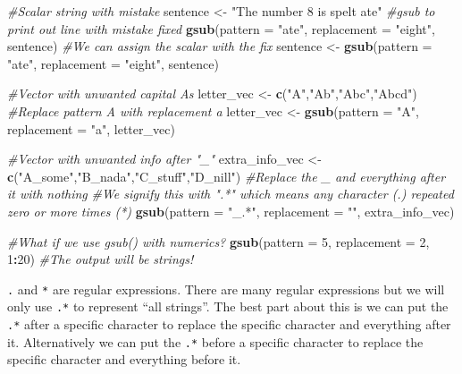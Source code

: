 \documentclass[]{book}
\newenvironment{Shaded}{\begin{snugshade}}{\end{snugshade}}
\newcommand{\KeywordTok}[1]{\textcolor[rgb]{0.13,0.29,0.53}{\textbf{#1}}}
\newcommand{\DataTypeTok}[1]{\textcolor[rgb]{0.13,0.29,0.53}{#1}}
\newcommand{\DecValTok}[1]{\textcolor[rgb]{0.00,0.00,0.81}{#1}}
\newcommand{\StringTok}[1]{\textcolor[rgb]{0.31,0.60,0.02}{#1}}
\newcommand{\CommentTok}[1]{\textcolor[rgb]{0.56,0.35,0.01}{\textit{#1}}}
\newcommand{\OperatorTok}[1]{\textcolor[rgb]{0.81,0.36,0.00}{\textbf{#1}}}
\newcommand{\NormalTok}[1]{#1}
\begin{document}
\begin{Shaded}
\begin{Highlighting}[]
\CommentTok{#Scalar string with mistake}
\NormalTok{sentence <-}\StringTok{ "The number 8 is spelt ate"}
\CommentTok{#gsub to print out line with mistake fixed}
\KeywordTok{gsub}\NormalTok{(}\DataTypeTok{pattern =} \StringTok{"ate"}\NormalTok{, }\DataTypeTok{replacement =} \StringTok{"eight"}\NormalTok{, sentence)}
\CommentTok{#We can assign the scalar with the fix}
\NormalTok{sentence <-}\StringTok{ }\KeywordTok{gsub}\NormalTok{(}\DataTypeTok{pattern =} \StringTok{"ate"}\NormalTok{, }\DataTypeTok{replacement =} \StringTok{"eight"}\NormalTok{, sentence)}

\CommentTok{#Vector with unwanted capital As}
\NormalTok{letter_vec <-}\StringTok{ }\KeywordTok{c}\NormalTok{(}\StringTok{"A"}\NormalTok{,}\StringTok{"Ab"}\NormalTok{,}\StringTok{"Abc"}\NormalTok{,}\StringTok{"Abcd"}\NormalTok{)}
\CommentTok{#Replace pattern A with replacement a}
\NormalTok{letter_vec <-}\StringTok{ }\KeywordTok{gsub}\NormalTok{(}\DataTypeTok{pattern =} \StringTok{"A"}\NormalTok{, }\DataTypeTok{replacement =} \StringTok{"a"}\NormalTok{, letter_vec)}

\CommentTok{#Vector with unwanted info after "_"}
\NormalTok{extra_info_vec <-}\StringTok{ }\KeywordTok{c}\NormalTok{(}\StringTok{"A_some"}\NormalTok{,}\StringTok{"B_nada"}\NormalTok{,}\StringTok{"C_stuff"}\NormalTok{,}\StringTok{"D_nill"}\NormalTok{)}
\CommentTok{#Replace the _ and everything after it with nothing}
\CommentTok{#We signify this with ".*" which means any character (.) repeated zero or more times (*)}
\KeywordTok{gsub}\NormalTok{(}\DataTypeTok{pattern =} \StringTok{"_.*"}\NormalTok{, }\DataTypeTok{replacement =} \StringTok{""}\NormalTok{, extra_info_vec)}

\CommentTok{#What if we use gsub() with numerics?}
\KeywordTok{gsub}\NormalTok{(}\DataTypeTok{pattern =} \DecValTok{5}\NormalTok{, }\DataTypeTok{replacement =} \DecValTok{2}\NormalTok{, }\DecValTok{1}\OperatorTok{:}\DecValTok{20}\NormalTok{)}
\CommentTok{#The output will be strings!}
\end{Highlighting}
\end{Shaded}

\texttt{.} and \texttt{*} are regular expressions. There are many
regular expressions but we will only use \texttt{.*} to represent ``all
strings''. The best part about this is we can put the \texttt{.*} after
a specific character to replace the specific character and everything
after it. Alternatively we can put the \texttt{.*} before a specific
character to replace the specific character and everything before it.
\end{document}
